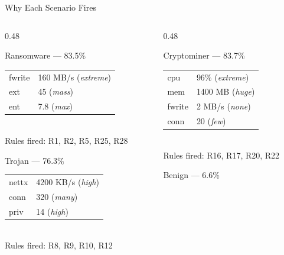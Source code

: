\documentclass[aspectratio=169,12pt]{beamer}
\begin{document}
\begin{frame}{Why Each Scenario Fires}
  \begin{columns}[T]
    \begin{column}{0.48\textwidth}
      \begin{alertblock}{\small Ransomware — 83.5\%}
        \footnotesize
        \begin{tabular}{@{}ll@{}}
          fwrite & 160 MB/s (\textit{extreme}) \\
          ext    & 45 (\textit{mass}) \\
          ent    & 7.8 (\textit{max}) \\
        \end{tabular}\\
        Rules fired: R1, R2, R5, R25, R28
      \end{alertblock}
      \vspace{0.1em}
      \begin{block}{\small Trojan — 76.3\%}
        \footnotesize
        \begin{tabular}{@{}ll@{}}
          nettx & 4200 KB/s (\textit{high}) \\
          conn  & 320 (\textit{many}) \\
          priv  & 14 (\textit{high}) \\
        \end{tabular}\\
        Rules fired: R8, R9, R10, R12
      \end{block}
    \end{column}
    \begin{column}{0.48\textwidth}
      \begin{block}{\small Cryptominer — 83.7\%}
        \footnotesize
        \begin{tabular}{@{}ll@{}}
          cpu    & 96\% (\textit{extreme}) \\
          mem    & 1400 MB (\textit{huge}) \\
          fwrite & 2 MB/s (\textit{none}) \\
          conn   & 20 (\textit{few}) \\
        \end{tabular}\\
        Rules fired: R16, R17, R20, R22
      \end{block}
      \vspace{0.1em}
      \begin{exampleblock}{\small Benign — 6.6\%}

\end{exampleblock}
\end{column}
\end{columns}
\end{frame}
\end{document}

